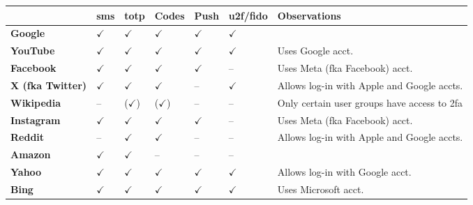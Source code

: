 {\begin{table*}
  \centering
  \begin{subtable}{\linewidth}
    \small
\begin{tabularx}{\linewidth}{|p{1.995cm}|*{5}{>{\centering\arraybackslash}X|}p{5.545cm}|}
  \cline{2-7}
  \multicolumn{1}{c|}{} & \textbf{\acs{sms}} & \textbf{\acs{totp}} & \textbf{Codes} & \textbf{Push} & \textbf{\acs{u2f}/\acs{fido}} & \textbf{Observations} \\ \hline
  \textbf{Google}       & $\checkmark$ & $\checkmark$  & $\checkmark$            & $\checkmark$  & $\checkmark$      &                       \\ \hline
  \textbf{YouTube}      & $\checkmark$ & $\checkmark$  & $\checkmark$            & $\checkmark$  & $\checkmark$      & Uses Google acct.    \\ \hline
  \textbf{Facebook}     & $\checkmark$ & $\checkmark$  & $\checkmark$            & $\checkmark$  & --                & Uses Meta (fka Facebook) acct.                      \\ \hline
  \textbf{X (fka Twitter)} & $\checkmark$ & $\checkmark$  & $\checkmark$            & --            & $\checkmark$      & Allows log-in with Apple and Google accts.                             \\ \hline
  \textbf{Wikipedia}    & --            & ($\checkmark$)  & ($\checkmark$)            & --            & --                & Only certain user groups have access to \ac{2fa} \\ \hline
  \textbf{Instagram}    & $\checkmark$ & $\checkmark$  & $\checkmark$            & $\checkmark$  & --                & Uses Meta (fka Facebook) acct.                                                     \\ \hline
  \textbf{Reddit}       & --            & $\checkmark$  & $\checkmark$            & --            & --                & Allows log-in with Apple and Google accts.                             \\ \hline
  \textbf{Amazon}       & $\checkmark$ & $\checkmark$  & --                        & --            & --                &                       \\ \hline
  \textbf{Yahoo}        & $\checkmark$ & $\checkmark$  & $\checkmark$            & $\checkmark$  & $\checkmark$      & Allows log-in with Google acct.                                        \\ \hline
  \textbf{Bing}         & $\checkmark$ & $\checkmark$  & $\checkmark$            & $\checkmark$  & $\checkmark$      & Uses Microsoft acct.                                                    \\ \hline

\end{tabularx}
\end{subtable}
\end{table*}}
